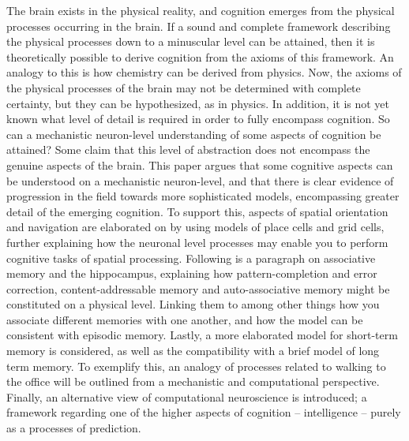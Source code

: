 The brain exists in the physical reality, and cognition emerges from the physical processes occurring in the brain. If a sound and complete framework describing the physical processes down to a minuscular level can be attained, then it is theoretically possible to derive cognition from the axioms of this framework. An analogy to this is how chemistry can be derived from physics. Now, the axioms of the physical processes of the brain may not be determined with complete certainty, but they can be hypothesized, as in physics. In addition, it is not yet known what level of detail is required in order to fully encompass cognition. So can a mechanistic neuron-level understanding of some aspects of cognition be attained? Some claim that this level of abstraction does not encompass the genuine aspects of the brain. This paper argues that some cognitive aspects can be understood on a mechanistic neuron-level, and that there is clear evidence of progression in the field towards more sophisticated models, encompassing greater detail of the emerging cognition. To support this, aspects of spatial orientation and navigation are elaborated on by using models of place cells and grid cells, further explaining how the neuronal level processes may enable you to perform cognitive tasks of spatial processing. Following is a paragraph on associative memory and the hippocampus, explaining how pattern-completion and error correction, content-addressable memory and auto-associative memory might be constituted on a physical level. Linking them to among other things how you associate different memories with one another, and how the model can be consistent with episodic memory. Lastly, a more elaborated model for short-term memory is considered, as well as the compatibility with a brief model of long term memory. To exemplify this, an analogy of processes related to walking to the office will be outlined from a mechanistic and computational perspective. Finally, an alternative view of computational neuroscience is introduced; a framework regarding one of the higher aspects of cognition – intelligence – purely as a processes of prediction. 
